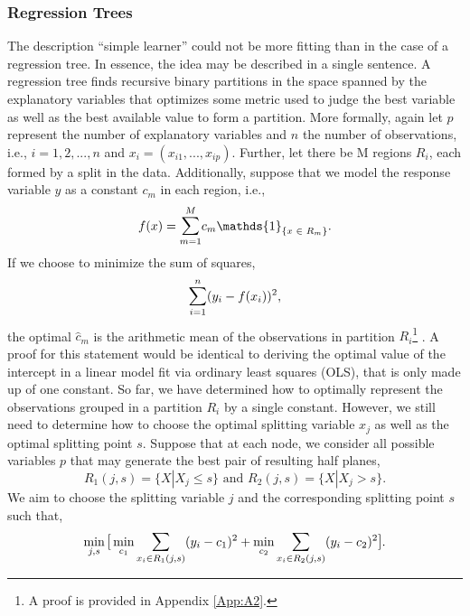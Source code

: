\documentclass[a4paper,12pt, headsepline]{scrartcl}
\DeclareMathOperator*{\minA}{min}
\numberwithin{equation}{section}
\begin{document}
\subsubsection{Regression Trees}\label{subsubsec:trees}
The description \enquote{simple learner} could not be more fitting than in the case of a regression tree. In essence, the idea may be described in a single sentence. A regression tree finds recursive binary partitions in the space spanned by the explanatory variables that optimizes some metric used to judge the best variable as well as the best available value to form a partition. More formally, again let $p$ represent the number of explanatory variables and $n$ the number of observations, i.e., $i = 1, 2, ..., n$ and $x_i = (x_{i1}, ..., x_{ip})$. Further, let there be M regions $R_i$, each formed by a split in the data. Additionally, suppose that we model the response variable $y$ as a constant $c_m$ in each region, i.e.,
\[
f(x) = \mathlarger{\sum}\limits_{m = 1}^{M} c_m \mathds{1}_{\{x \text{ } \in \text{ } R_m\}}.
\]
If we choose to minimize the sum of squares, 
\[
\mathlarger{\sum}\limits_{i = 1}^{n}(y_i - f(x_i))^2,
\]
the optimal $\hat c_m$ is the arithmetic mean of the observations in partition $R_i$\footnote{A proof is provided in Appendix \ref{App:A2}.} \citep{hastie09}. A proof for this statement would be identical to deriving the optimal value of the intercept in a linear model fit via ordinary least squares (OLS), that is only made up of one constant. So far, we have determined how to optimally represent the observations grouped in a partition $R_i$ by a single constant. However, we still need to determine how to choose the optimal splitting variable $x_j$ as well as the optimal splitting point $s$. Suppose that at each node, we consider all possible variables $p$ that may generate the best pair of resulting half planes,
\[
R_1(j, s) = \{X|X_j \leq s\} \text{ and } R_2(j, s) = \{X|X_j > s\}.
\]
We aim to choose the splitting variable $j$ and the corresponding splitting point $s$ such that,
\[
\minA_{j, s}\mathlarger{[} \minA_{c_1} \mathlarger{\sum}\limits_{x_i \in R_1(j, s)} (y_i - c_1)^2 + \minA_{c_2} \mathlarger{\sum}\limits_{x_i \in R_2(j, s)} (y_i - c_2)^2 \mathlarger{]}.
\]
\end{document}
